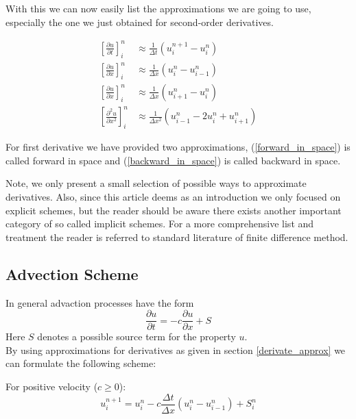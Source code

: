 \documentclass[]{article}
\begin{document}
With this we can now easily list the approximations we are going to use, especially the one
we just obtained for second-order derivatives.

\begin{eqnarray}
	\left[\frac{\partial u}{\partial t}\right]_{i}^{n} & \approx \frac{1}{\Delta t}(u_{i}^{n+1}-u_{i}^{n}) \nonumber  \\
	\left[\frac{\partial u}{\partial x}\right]_{i}^{n} & \approx \frac{1}{\Delta x}(u_{i}^{n}-u_{i-1}^{n})  \label{backward_in_space} \\
	\left[\frac{\partial u}{\partial x}\right]_{i}^{n} & \approx \frac{1}{\Delta x}(u_{i+1}^{n}-u_{i}^{n}) \label{forward_in_space}  \\
	\left[\frac{\partial^2 u}{\partial x^2}\right]_{i}^{n} & \approx
	\frac{1}{\Delta x^2}(u_{i-1}^{n}-2u_{i}^{n}+u_{i+1}^{n}) \nonumber
\end{eqnarray}

For first derivative we have provided two approximations, (\ref{forward_in_space}) is called
forward in space and (\ref{backward_in_space}) is called backward in space.

Note, we only present a small selection of possible ways to approximate derivatives. Also, since this article deems as an introduction we only focused on explicit schemes, but the reader should be aware there exists another important category of so called implicit schemes.
For a more comprehensive list and treatment the reader is referred to standard literature of finite difference method.

\subsection{Advection Scheme}

In general advaction processes have the form
\begin{equation*}
\frac{\partial u}{\partial t} = -c \frac{\partial u}{\partial x} + S
\end{equation*}
Here $S$ denotes a possible source term for the property $u$.\\
By using approximations for derivatives as given in section \ref{derivate_approx}
we can formulate the following scheme:

For positive velocity ($c\geq 0$):
\begin{equation} \label{advection_scheme_upwind}
u_{i}^{n+1}=u_{i}^{n}-c\frac{\Delta t}{\Delta x} (u_{i}^{n}-u_{i-1}^{n}) + S_{i}^{n}
\end{equation}
\end{document}
